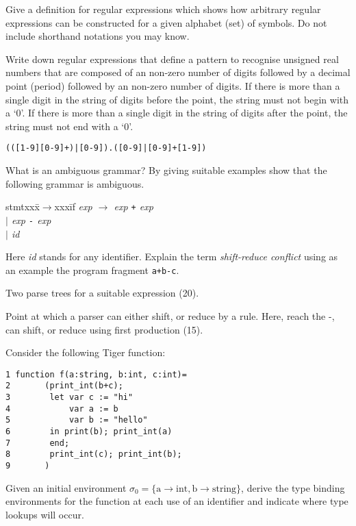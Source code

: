 \documentclass[11pt]{cityexam}
\begin{document}
\begin{questions}


\question

\begin{subquestions}


\subquestion
Give a definition for regular expressions which shows how
arbitrary regular expressions can be constructed for a
given alphabet (set) of symbols. Do not include shorthand
notations you may know.

\subquestion
Write down regular expressions that define a pattern to recognise
unsigned real numbers that are composed of an non-zero number of digits
followed by a decimal point (period) followed by an non-zero number of
digits. If there is more than a single digit in the string of 
digits before the point, the string must not begin with a `0'. 
If there is more than a single digit in the string of digits after the point, 
the string must not end with a `0'.
\begin{modelanswer}
\begin{verbatim}
(([1-9][0-9]+)|[0-9]).([0-9]|[0-9]+[1-9])
\end{verbatim}
\end{modelanswer}

\subquestion
What is an ambiguous grammar? 
By giving suitable examples show that the
        following grammar is ambiguous. 
\begin{tabbing}
stmtxxx\=$\rightarrow$xxx\=if\kill
\it
exp \> $\rightarrow$ \> {\it exp\/} \verb!+! {\it exp} \\
\it
     \> $\mid$ \> {\it exp\/} \verb!-! {\it exp\/} \\
     \> $\mid$ \> {\it id}
\end{tabbing}
Here {\it id\/} stands for any identifier.
Explain the term {\em shift-reduce conflict\/} using as
an example the program fragment \verb!a+b-c!.

\begin{modelanswer}
Two parse trees for a suitable expression (20).

Point at which a parser can either shift, or reduce by a rule. 
Here, reach the -, can shift, or reduce using first production (15).
\end{modelanswer}


\subquestion
Consider the following Tiger function:
\begin{verbatim}
1 function f(a:string, b:int, c:int)=
2       (print_int(b+c);
3        let var c := "hi"
4            var a := b
5            var b := "hello"
6        in print(b); print_int(a) 
7        end;
8        print_int(c); print_int(b);
9       )
\end{verbatim}
Given an initial environment $\sigma_0 = \{\textrm{a} \rightarrow \textrm{int}, \textrm{b} \rightarrow \textrm{string}\}$, derive the type binding environments for the function at each
use of an identifier and indicate where type lookups will occur.


\end{subquestions}
\end{questions}
\end{document}
